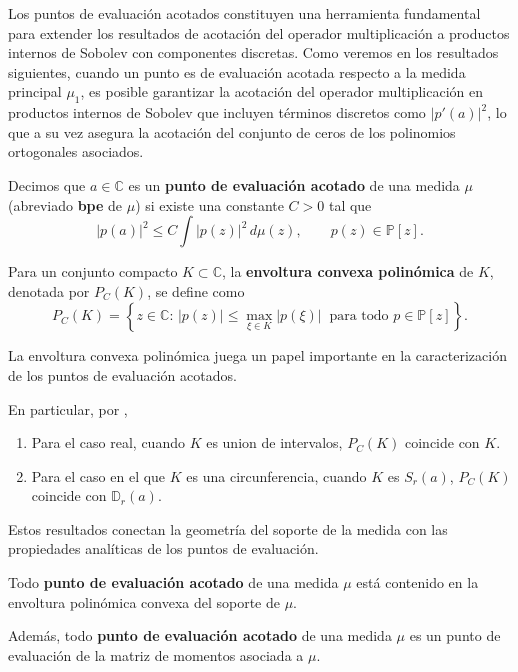 Los puntos de evaluación acotados constituyen una herramienta fundamental para extender los resultados de acotación del operador multiplicación a productos internos de Sobolev con componentes discretas. Como veremos en los resultados siguientes, cuando un punto es de evaluación acotada respecto a la medida principal $\mu_1$, es posible garantizar la acotación del operador multiplicación en productos internos de Sobolev que incluyen términos discretos como $|p'(a)|^2$, lo que a su vez asegura la acotación del conjunto de ceros de los polinomios ortogonales asociados.

\begin{definition}\label{def:bounded_eval_point}
  \cite{escribano2025zeros}
  Decimos que \(a\in\mathbb{C}\) es un \textbf{punto de evaluación acotado} de una medida \(\mu\) (abreviado \textbf{bpe} de \(\mu\)) si existe una constante \(C>0\) tal que
  \[
    |p(a)|^{2} \leq C \int |p(z)|^{2}\,d\mu(z), \qquad p(z)\in\mathbb{P}[z].
  \]
\end{definition}

\begin{definition}\label{def:poly_convex_hull}
  \cite{escribano2025zeros}
  Para un conjunto compacto \(K \subset \mathbb{C}\), la \textbf{envoltura convexa polinómica} de \(K\), denotada por \(P_C(K)\), se define como
  \[
    P_C(K) =
    \left\{ z \in \mathbb{C} :\, |p(z)| \leq \max_{\xi\in K}|p(\xi)|\ \text{ para todo } p\in\mathbb{P}[z] \right\}.
  \]
\end{definition}

La envoltura convexa polinómica juega un papel importante en la caracterización de los puntos de evaluación acotados.

En particular, por \cite{Conway1978}, \cite{Gamelin1969}
\begin{enumerate}
  \item Para el caso real, cuando $K$ es union de intervalos, $P_C(K)$ coincide con $K$.
  \item Para el caso en el que $K$ es una circunferencia, cuando $K$ es $S_{r}(a)$, $P_C(K)$ coincide con $\mathbb{D}_{r}(a)$.
\end{enumerate}

Estos resultados conectan la geometría del soporte de la medida con las propiedades analíticas de los puntos de evaluación.

\begin{lemma}\label{lem:bounded_eval_point_in_hull}
  \cite{escribano2025zeros} Todo \textbf{punto de evaluación acotado} de una medida $\mu$ está contenido en la envoltura polinómica convexa del soporte de $\mu$.

  \noindent Además, todo \textbf{punto de evaluación acotado} de una medida $\mu$ es un punto de evaluación de la matriz de momentos asociada a $\mu$.
\end{lemma}

